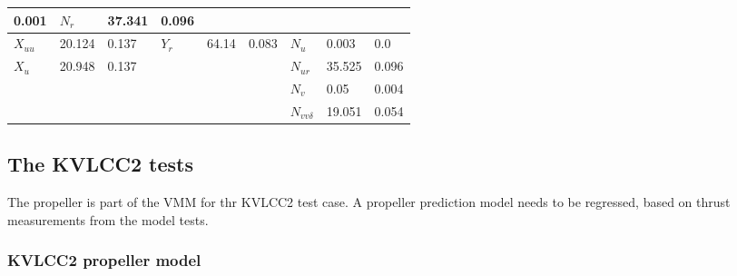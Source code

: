 \documentclass[review]{elsarticle}
\begin{document}
\begin{savenotes}
\begin{tabulary}{\linewidth}[t]{|T|T|T|T|T|T|T|T|T|}
 0.001
 &
 
 \( N_{r} \)
 &
 
 \sphinxhyphen{}37.341
 &
 
 0.096
 \\
 \hline
 
 \( X_{uu} \)
 &
 
 20.124
 &
 
 0.137
 &
 
 \( Y_{r} \)
 &
 
 64.14
 &
 
 0.083
 &
 
 \( N_{u} \)
 &
 
 \sphinxhyphen{}0.003
 &
 
 0.0
 \\
 \hline
 
 \( X_{u} \)
 &
 
 \sphinxhyphen{}20.948
 &
 
 0.137
 &&&&
 
 \( N_{ur} \)
 &
 
 35.525
 &
 
 0.096
 \\
 \hline&&&&&&
 
 \( N_{v} \)
 &
 
 \sphinxhyphen{}0.05
 &
 
 0.004
 \\
 \hline&&&&&&
 
 \( N_{vv\delta} \)
 &
 
 \sphinxhyphen{}19.051
 &
 
 0.054
 \\
 \hline
 \end{tabulary}
 \par
 \sphinxattableend\end{savenotes}


\subsection{The KVLCC2 tests}
\label{\detokenize{06.20_results_kvlcc2:kvlcc2-tests}}\label{\detokenize{06.20_results_kvlcc2::doc}}

The propeller is part of the VMM for thr KVLCC2 test case. A propeller prediction model needs to be regressed, based on thrust measurements from the model tests.

\subsubsection{KVLCC2 propeller model}
\label{\detokenize{06.20_results_kvlcc2:kvlcc2-propeller-model}}\label{\detokenize{06.20_results_kvlcc2:results-propeller-model}}
  
\end{document}
